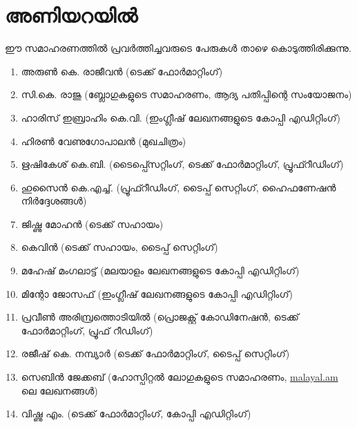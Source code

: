 ﻿\section*{അണിയറയില്‍}

ഈ സമാഹരണത്തില്‍ പ്രവര്‍ത്തിച്ചവരുടെ പേരുകള്‍ താഴെ കൊടുത്തിരിക്കുന്നു. 

\begin{enumerate}
 \item അരുണ്‍ കെ. രാജീവന്‍ (ടെക്ക് ഫോര്‍മാറ്റിംഗ്)
 \item സി.കെ. രാജു (ബ്ലോഗുകളുടെ സമാഹരണം, ആദ്യ പതിപ്പിന്റെ സംയോജനം)
 \item ഹാരിസ് ഇബ്രാഹിം  കെ.വി. (ഇംഗ്ലീഷ് ലേഖനങ്ങളുടെ കോപ്പി എഡിറ്റിംഗ്)
 \item ഹിരണ്‍ വേണുഗോപാലന്‍ (മുഖചിത്രം)
 \item ഋഷികേശ് കെ.ബി. (ടൈപ്പ്സെറ്റിംഗ്, ടെക്ക് ഫോര്‍മാറ്റിംഗ്, പ്രൂഫ്റീഡിംഗ്)
 \item ഹുസൈന്‍ കെ.എച്ച്. (പ്രൂഫ്റീഡിംഗ്, ടൈപ്പ് സെറ്റിംഗ്, ഹൈഫണേഷന്‍ നിര്‍ദ്ദേശങ്ങള്‍)
 \item ജിഷ്ണു മോഹന്‍ (ടെക്ക് സഹായം)  
 \item കെവിന്‍ (ടെക്ക് സഹായം, ടൈപ്പ് സെറ്റിംഗ്)
  \item മഹേഷ് മംഗലാട്ട് (മലയാളം ലേഖനങ്ങളുടെ കോപ്പി എഡിറ്റിംഗ്)
 \item മിന്റോ ജോസഫ് (ഇംഗ്ലീഷ് ലേഖനങ്ങളുടെ കോപ്പി എഡിറ്റിംഗ്)
 \item പ്രവീണ്‍ അരിമ്പ്രത്തൊടിയില്‍ (പ്രൊജക്റ്റ് കോഡിനേഷന്‍, ടെക്ക് ഫോര്‍മാറ്റിംഗ്, പ്രൂഫ് റീഡിംഗ്)
 \item രജീഷ് കെ. നമ്പ്യാര്‍ (ടെക്ക് ഫോര്‍മാറ്റിംഗ്, ടൈപ്പ് സെറ്റിംഗ്)
 \item സെബിന്‍ ജേക്കബ് (ഹോസ്പിറ്റല്‍ ലോഗുകളുടെ സമാഹരണം, \url{malayal.am} ലെ ലേഖനങ്ങള്‍)
 \item വിഷ്ണു എം. (ടെക്ക് ഫോര്‍മാറ്റിംഗ്, കോപ്പി എഡിറ്റിംഗ്)
\end{enumerate}

\newpage

